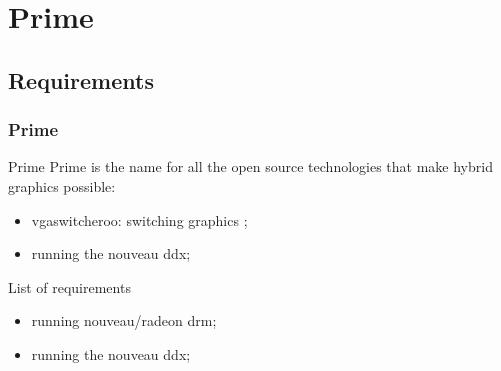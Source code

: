 \documentclass[11pt,english,compress]{beamer}
\begin{document}
\section{Prime}
\subsection{Requirements}
\begin{frame}
	\frametitle{Prime}

	\begin{block}{Prime}
		Prime is the name for all the open source technologies that make
		hybrid graphics possible:
		\begin{itemize}
			\item vgaswitcheroo: switching graphics ;
			\item running the nouveau ddx;
		\end{itemize}
	\end{block}

	\begin{block}{List of requirements}
		\begin{itemize}
			\item running nouveau/radeon drm;
			\item running the nouveau ddx;
		\end{itemize}
	\end{block}
\end{frame}


\end{document}
